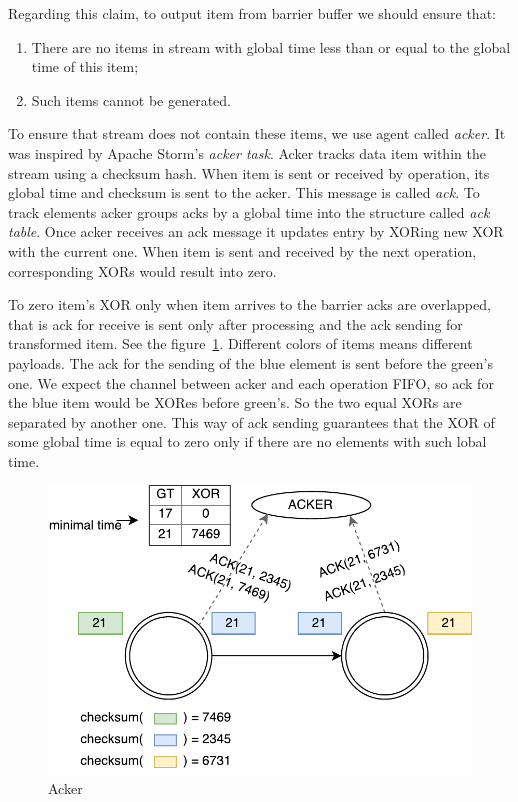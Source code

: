 Regarding this claim, to output item from barrier buffer we should ensure that:
\begin{enumerate}
    \item There are no items in stream with global time less than or equal to the global time of this item;
    \item Such items cannot be generated.
\end{enumerate}

To ensure that stream does not contain these items, we use agent called {\it acker}. It was inspired by Apache Storm's \cite{apache:storm} {\it acker task}. Acker tracks data item within the stream using a checksum hash. When item is sent or received by operation, its global time and checksum is sent to the acker. This message is called {\it ack}. To track elements acker groups acks by a global time into the structure called {\it ack table}. Once acker receives an ack message it updates entry by XORing new XOR with the current one. When item is sent and received by the next operation, corresponding XORs would result into zero.

To zero item's XOR only when item arrives to the barrier acks are overlapped, that is ack for receive is sent only after processing and the ack sending for transformed item. See the figure~\ref{acker}. Different colors of items means different payloads. The ack for the sending of the blue element is sent before the green's one. We expect the channel between acker and each operation FIFO, so ack for the blue item would be XORes before green's. So the two equal XORs are separated by another one. This way of ack sending guarantees that the XOR of some global time is equal to zero only if there are no elements with such lobal time.

\begin{figure}[htbp]
  \centering
  \includegraphics[scale=0.5]{pics/acker}
  \caption{Acker}
  \label {acker}
\end{figure}

